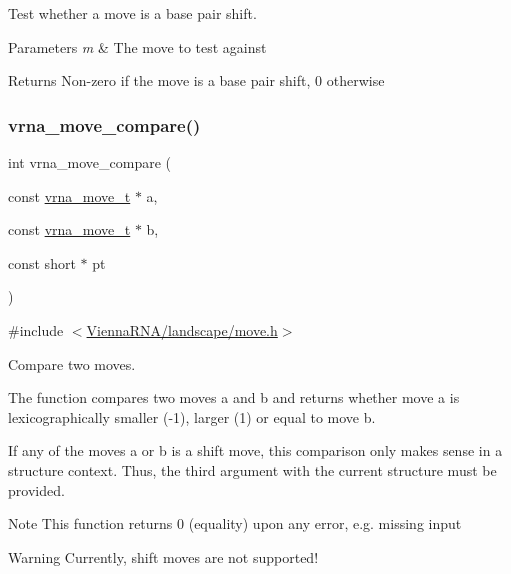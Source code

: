 Test whether a move is a base pair shift. 


\begin{DoxyParams}{Parameters}
{\em m} & The move to test against \\
\hline
\end{DoxyParams}
\begin{DoxyReturn}{Returns}
Non-\/zero if the move is a base pair shift, 0 otherwise 
\end{DoxyReturn}
\mbox{\label{group__neighbors_ga7aa139b99eec837e646973ffa23b6a9d}} 
\subsubsection{\texorpdfstring{vrna\_move\_compare()}{vrna\_move\_compare()}}
{\footnotesize\ttfamily int vrna\+\_\+move\+\_\+compare (\begin{DoxyParamCaption}\item[{const \mbox{\hyperlink{group__neighbors_ga08630e00206cd163ea29c462bf5f4755}{vrna\+\_\+move\+\_\+t}} $\ast$}]{a,  }\item[{const \mbox{\hyperlink{group__neighbors_ga08630e00206cd163ea29c462bf5f4755}{vrna\+\_\+move\+\_\+t}} $\ast$}]{b,  }\item[{const short $\ast$}]{pt }\end{DoxyParamCaption})}



{\ttfamily \#include $<$\mbox{\hyperlink{move_8h}{Vienna\+R\+N\+A/landscape/move.\+h}}$>$}



Compare two moves. 

The function compares two moves {\ttfamily a} and {\ttfamily b} and returns whether move {\ttfamily a} is lexicographically smaller (-\/1), larger (1) or equal to move {\ttfamily b}.

If any of the moves {\ttfamily a} or {\ttfamily b} is a shift move, this comparison only makes sense in a structure context. Thus, the third argument with the current structure must be provided.

\begin{DoxyNote}{Note}
This function returns 0 (equality) upon any error, e.\+g. missing input
\end{DoxyNote}
\begin{DoxyWarning}{Warning}
Currently, shift moves are not supported!
\end{DoxyWarning}

